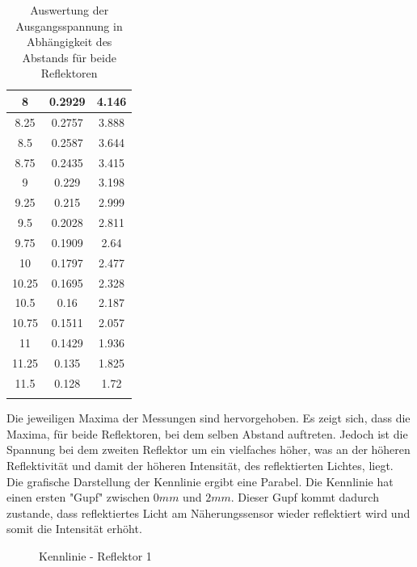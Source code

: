 \documentclass[a4paper,12pt]{article}
\begin{document}
\begin{longtable}[h]{|c|c|c|}
			8 & 0.2929 & 4.146 \\ \hline
			8.25 & 0.2757 & 3.888 \\ \hline
			8.5 & 0.2587 & 3.644 \\ \hline
			8.75 & 0.2435 & 3.415 \\ \hline
			9 & 0.229 & 3.198 \\ \hline
			9.25 & 0.215 & 2.999 \\ \hline
			9.5 & 0.2028 & 2.811 \\ \hline
			9.75 & 0.1909 & 2.64 \\ \hline
			10 & 0.1797 & 2.477 \\ \hline
			10.25 & 0.1695 & 2.328 \\ \hline
			10.5 & 0.16 & 2.187 \\ \hline
			10.75 & 0.1511 & 2.057 \\ \hline
			11 & 0.1429 & 1.936 \\ \hline
			11.25 & 0.135 & 1.825 \\ \hline
			11.5 & 0.128 & 1.72 \\ \hline
			\caption{Auswertung der Ausgangsspannung in Abhängigkeit des Abstands für beide Reflektoren}
			\label{tab:my-table}
	\end{longtable}
	Die jeweiligen Maxima der Messungen sind hervorgehoben. Es zeigt sich, dass die Maxima, für beide Reflektoren, bei dem selben Abstand auftreten. Jedoch ist die Spannung bei dem zweiten Reflektor um ein vielfaches höher, was an der höheren Reflektivität und damit der höheren Intensität, des reflektierten Lichtes, liegt.\\ \newline
	Die grafische Darstellung der Kennlinie ergibt eine Parabel. Die Kennlinie hat einen ersten "Gupf" zwischen $0mm$ und $2mm$. Dieser Gupf kommt dadurch zustande, dass reflektiertes Licht am Näherungssensor wieder reflektiert wird und somit die Intensität erhöht.\\ \newline
	\begin{figure}[H]
		\centering
		\caption{Kennlinie - Reflektor 1}
	\end{figure}
\end{document}
